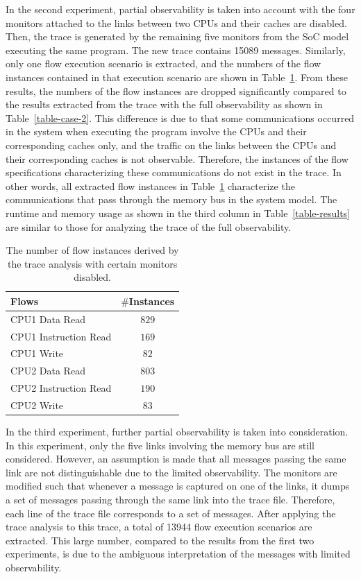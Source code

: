 \documentclass[12pt,frontmatter,copyright,thesis]{usfmanus}
\begin{document}
In the second experiment, partial observability is taken into account
with the four monitors attached to the links between two CPUs and their
caches are disabled. Then, the trace is generated by the
remaining five monitors from the SoC model executing the
same program.  The new trace contains 15089 messages.  
Similarly, only one flow execution
scenario is extracted, and the numbers of the
flow instances contained in that execution scenario are
shown in Table~\ref{table-par-obs}.  From these results, the
numbers of the flow instances are dropped significantly
compared to the results extracted from the trace with the
full observability as shown in
Table~\ref{table-case-2}. This difference is due to that
some communications occurred in the system when executing
the program involve the CPUs and their corresponding caches
only, and the traffic on the links between the CPUs and
their corresponding caches is not observable. Therefore, the
instances of the flow specifications characterizing these
communications do not exist in the trace. In other words,
all extracted flow instances in Table~\ref{table-par-obs}
characterize the communications that pass through the memory
bus in the system model.  The runtime and memory usage as shown in
the third column in Table~\ref{table-results} are
similar to those for analyzing the trace of the full
observability.

\begin{table}[tb]
\caption{The number of flow instances derived by the trace analysis with certain monitors disabled.}
\begin{center}
\begin{tabular}{|l|c|}
\hline
Flows & $\#$Instances \\
\hline
\hline
CPU1 Data Read			&  $829$\\
CPU1 Instruction Read		&  $169$\\
CPU1 Write				&  $82$\\
\hline
CPU2 Data Read			&  $803$\\
CPU2 Instruction Read		&  $190$\\
CPU2 Write				&  $83$\\
\hline
\end{tabular}
\end{center}
\label{table-par-obs}
\end{table}%

In the third experiment, further partial observability is taken into consideration.  In this experiment, only the five links involving the memory bus are still considered.  However, an assumption is made that all messages passing the same link are not distinguishable due to the limited observability.  The monitors are modified such that whenever a message is captured on one of the links, it dumps a set of messages passing through the same link into the trace file.  Therefore, each line of the trace file corresponds to a set of messages.  After applying the trace analysis to this trace,  a total of 13944 flow execution scenarios are extracted.    This large number, compared to the results from the first two experiments, is due to the ambiguous interpretation of the messages with limited observability.  
\end{document}
